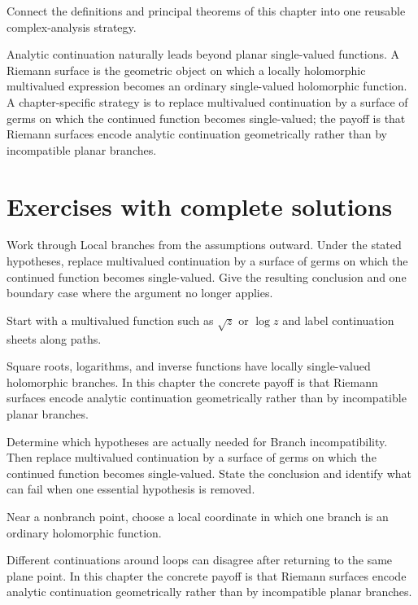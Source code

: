 \begin{problem}\label{prob:iv22-problem-12}
Connect the definitions and principal theorems of this chapter into one reusable complex-analysis strategy.
\end{problem}
\begin{solution}
Analytic continuation naturally leads beyond planar single-valued functions. A Riemann surface is the geometric object on which a locally holomorphic multivalued expression becomes an ordinary single-valued holomorphic function. A chapter-specific strategy is to replace multivalued continuation by a surface of germs on which the continued function becomes single-valued; the payoff is that Riemann surfaces encode analytic continuation geometrically rather than by incompatible planar branches.
\end{solution}

\section{Exercises with complete solutions}

\begin{exercise}\label{exr:iv22-01}
Work through Local branches from the assumptions outward. Under the stated hypotheses, replace multivalued continuation by a surface of germs on which the continued function becomes single-valued. Give the resulting conclusion and one boundary case where the argument no longer applies.
\end{exercise}
\begin{hint}
Start with a multivalued function such as \(\sqrt z\) or \(\log z\) and label continuation sheets along paths.
\end{hint}
\begin{solution}
Square roots, logarithms, and inverse functions have locally single-valued holomorphic branches. In this chapter the concrete payoff is that Riemann surfaces encode analytic continuation geometrically rather than by incompatible planar branches.
\end{solution}

\begin{exercise}\label{exr:iv22-02}
Determine which hypotheses are actually needed for Branch incompatibility. Then replace multivalued continuation by a surface of germs on which the continued function becomes single-valued. State the conclusion and identify what can fail when one essential hypothesis is removed.
\end{exercise}
\begin{hint}
Near a nonbranch point, choose a local coordinate in which one branch is an ordinary holomorphic function.
\end{hint}
\begin{solution}
Different continuations around loops can disagree after returning to the same plane point. In this chapter the concrete payoff is that Riemann surfaces encode analytic continuation geometrically rather than by incompatible planar branches.
\end{solution}

